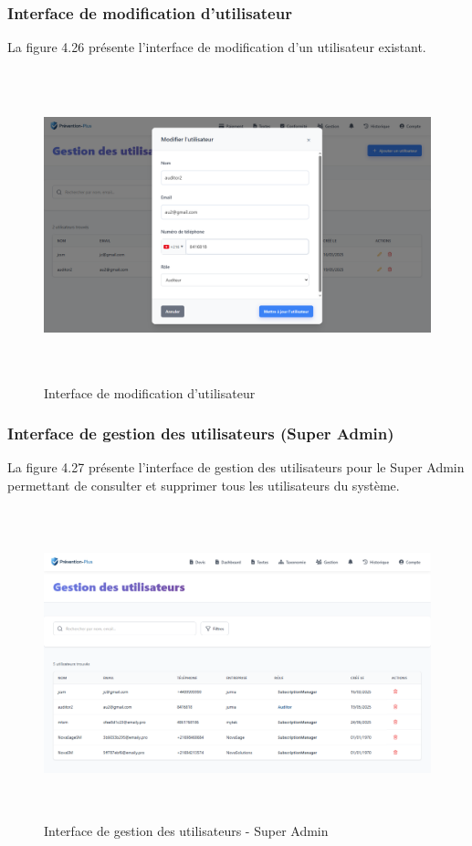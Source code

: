 \subsubsection{Interface de modification d'utilisateur}
\noindent La figure 4.26 présente l'interface de modification d'un utilisateur existant.

\begin{figure}[H]
    \centering
    \includegraphics[width=14cm,height=9cm]{images/editusermodal.PNG}
    \caption{Interface de modification d'utilisateur}
\end{figure}

\subsubsection{Interface de gestion des utilisateurs (Super Admin)}
\noindent La figure 4.27 présente l'interface de gestion des utilisateurs pour le Super Admin permettant de consulter et supprimer tous les utilisateurs du système.

\begin{figure}[H]
    \centering
    \includegraphics[width=14cm,height=9cm]{images/superadminmanageusers.PNG}
    \caption{Interface de gestion des utilisateurs - Super Admin}
\end{figure}

